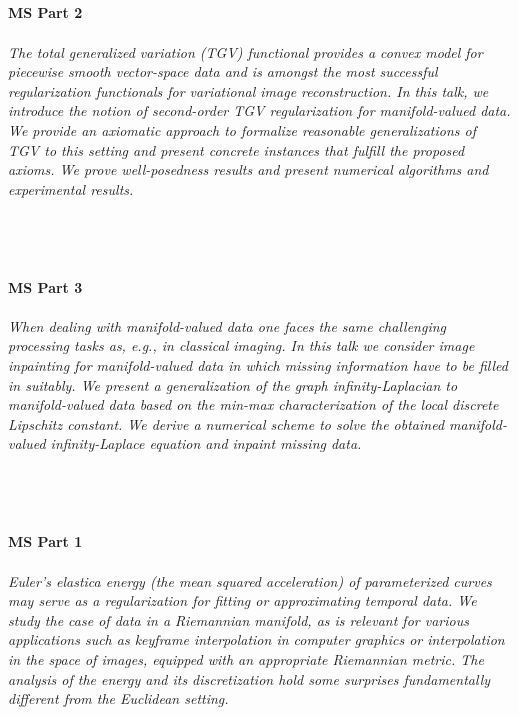 \begin{multicols}{2}
\\ 
    \\
    \\\\
    \noindent\textbf{MS Part 2}\\
\\  
    \textit{The total generalized variation (TGV) functional provides a convex model for piecewise smooth vector-space data and is amongst the most successful regularization functionals for variational image reconstruction. In this talk, we introduce the notion of second-order TGV regularization for manifold-valued data. We provide an axiomatic approach to formalize reasonable generalizations of TGV to this setting and present concrete instances that fulfill the proposed axioms. We prove well-posedness results and present numerical algorithms and experimental results.}\\
\\ 
    \\
    \\\\
    \noindent\textbf{MS Part 3}\\
\\  
    \textit{When dealing with manifold-valued data one faces the same challenging
processing tasks as, e.g., in classical imaging.
In this talk we consider image inpainting for manifold-valued data in which
missing information have to be filled in suitably. We present a generalization
of the graph infinity-Laplacian to manifold-valued data based on the
min-max characterization of the local discrete Lipschitz constant. We derive a
numerical scheme to solve the obtained manifold-valued infinity-Laplace equation
and inpaint missing data.}\\
\\ 
    \\
    \\\\
    \noindent\textbf{MS Part 1}\\
\\  
    \textit{Euler's elastica energy (the mean squared acceleration) of parameterized curves may serve as a regularization for fitting or approximating temporal data. We study the case of data in a Riemannian manifold, as is relevant for various applications such as keyframe interpolation in computer graphics or interpolation in the space of images, equipped with an appropriate Riemannian metric. The analysis of the energy and its discretization hold some surprises fundamentally different from the Euclidean setting.}\\

\end{multicols}
